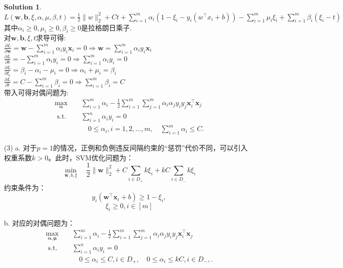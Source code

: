 \documentclass[a4paper,UTF8]{article}
\numberwithin{equation}{section}
\theoremstyle{definition}
\newtheorem*{solution}{Solution}
\def \x {\boldsymbol{x}}
\def \b {\mathbf{b}}
\newcommand{\vct}[1]{\boldsymbol{#1}} %
\newcommand{\vw}{\vct{w}}
\newcommand{\vx}{\vct{x}}
\begin{document}
\begin{solution}
$L(\vw,\b,\xi,\alpha,\mu,\beta,t)=\frac{1}{2}\|w\|_{2}^{2}+Ct+\sum_{i=1}^{m}\alpha_{i}(1-\xi_{i}-y_{i}(w^{\top}x_{i}+b))-\sum_{i=1}^{m}\mu_{i}\xi_{i}+\sum_{i=1}^{m}\beta_{i}(\xi_{i}-t)$\\
其中$\alpha_{i}\geq0,\mu_{i}\geq0,\beta_{i}\geq0$是拉格朗日乘子.\\
对$\vw,\b,\xi,t$求导可得:\\
$\frac{\partial L}{\partial \vw}=\vw-\sum_{i=1}^{m}\alpha_{i}y_{i}\x_{i}=0 \Rightarrow \vw=\sum_{i=1}^{m}\alpha_{i}y_{i}\x_{i}$\\
$\frac{\partial L}{\partial b}=-\sum_{i=1}^{m}\alpha_{i}y_{i}=0 \Rightarrow \sum_{i=1}^{m}\alpha_{i}y_{i}=0$\\
$\frac{\partial L}{\partial \xi_{i}}=\beta_{i}-\alpha_{i}-\mu_{i}=0 \Rightarrow \alpha_{i}+\mu_{i}=\beta_{i}$\\
$\frac{\partial L}{\partial t}=C-\sum_{i=1}^{m}\beta_{i}=0 \Rightarrow \sum_{i=1}^{m}\beta_{i}=C$\\
带入可得对偶问题为:
\begin{equation}
    \begin{aligned}
        \max _{\bm{\alpha}} \quad & \sum_{i=1}^{m}\alpha_{i}-\frac{1}{2}\sum_{i=1}^{m}\sum_{j=1}^{m}\alpha_{i}\alpha_{j}y_{i}y_{j}\x_{i}^{\top}\x_{j} \\
        \text { s.t. } \quad & \sum_{i=1}^{n}\alpha_{i}y_{i}=0 \\
        & \quad 0\leq \alpha_{i},i=1,2,...,m, \quad \sum_{i=1}^{m}\alpha_{i}\leq C.
    \end{aligned}
\end{equation}


(3)
a. 对于$p=1$的情况，正例和负例违反间隔约束的“惩罚”代价不同，可以引入权重系数$k>0$。此时，SVM优化问题为：
$$\min _{\vw, b, \xi} \quad \frac{1}{2}\|\vw\|_{2}^{2}+C \sum_{i \in D_{+}} k \xi_i +kC \sum_{i \in D_{-}} k \xi_i$$
约束条件为：
$$y_i(\vw^\top \vx_i + b) \geq 1-\xi_i, $$
$$\xi_i \geq 0, i \in [m]$$


b. 对应的对偶问题为：
\begin{equation}
    \begin{aligned}
        \max _{\bm{\alpha},\bm{\mu}} \quad & \sum_{i=1}^{m}\alpha_{i}-\frac{1}{2}\sum_{i=1}^{m}\sum_{j=1}^{m}\alpha_{i}\alpha_{j}y_{i}y_{j}\x_{i}^{\top}\x_{j} \\
        \text { s.t. } \quad & \sum_{i=1}^{n}\alpha_{i}y_{i}=0 \\
        & \quad 0\leq \alpha_{i}\leq C,i \in D_{+}, \quad 0\leq \alpha_{i}\leq kC,i \in D_{-},.
    \end{aligned}
\end{equation}
\end{solution}
\end{document}
